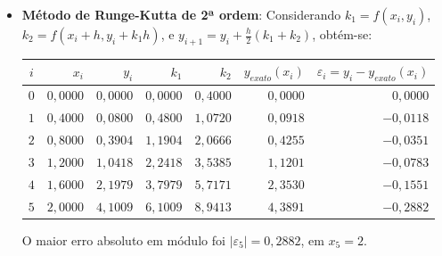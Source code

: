 \documentclass[12pt,a4paper]{article}
\begin{document}
\begin{enumerate}
\begin{enumerate}
\begin{itemize}
\item \textbf{Método de Runge-Kutta de 2ª ordem}: Considerando
$k_1 = f(x_i, y_i)$,
$k_2 = f(x_i + h, y_i + k_1 h)$, e
$y_{i+1} = y_i + \frac{h}{2} (k_1 + k_2)$, obtém-se:
\medskip
\begin{center}
    \begin{tabular}{crrrrrr}
    \hline
      $i$ & $x_i$  & $y_i$ & $k_1$ & $k_2$ & $y_{exato}(x_i)$
      & $\varepsilon_i = y_i-y_{exato}(x_i)$ \\ \hline
    $0$ & $0,0000$ & $0,0000$ & $0,0000$ & $0,4000$ & $0,0000$ & $ 0,0000$ \\
    $1$ & $0,4000$ & $0,0800$ & $0,4800$ & $1,0720$ & $0,0918$ & $-0,0118$ \\
    $2$ & $0,8000$ & $0,3904$ & $1,1904$ & $2,0666$ & $0,4255$ & $-0,0351$ \\
    $3$ & $1,2000$ & $1,0418$ & $2,2418$ & $3,5385$ & $1,1201$ & $-0,0783$ \\
    $4$ & $1,6000$ & $2,1979$ & $3,7979$ & $5,7171$ & $2,3530$ & $-0,1551$ \\
    $5$ & $2,0000$ & $4,1009$ & $6,1009$ & $8,9413$ & $4,3891$ & $-0,2882$ \\
    \hline
    \end{tabular}
\end{center}
\medskip
O maior erro absoluto em módulo foi $|\varepsilon_5| = 0,2882$, em $x_5 = 2$.


\end{itemize}
\end{enumerate}
\end{enumerate}
\end{document}
